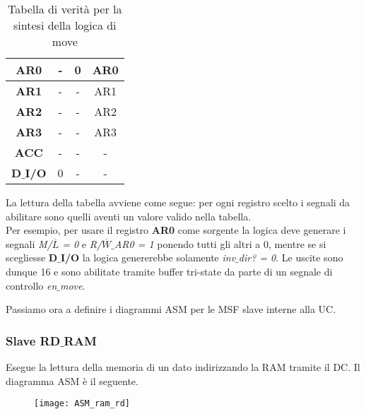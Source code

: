 \begin{table}[H]
\begin{tabular}{|p{25mm}|p{5mm}|p{5mm}|p{25mm}|}
		\hline
		\multicolumn{1}{|c|}{\textbf{AR0}} &
		\multicolumn{1}{c|}{-} &
		\multicolumn{1}{|c|}{0} &
		\multicolumn{1}{c|}{AR0}\\
		
		\hline
		\multicolumn{1}{|c|}{\textbf{AR1}} &
		\multicolumn{1}{c|}{-} &
		\multicolumn{1}{|c|}{-} &
		\multicolumn{1}{c|}{AR1}\\
		
		\hline
		\multicolumn{1}{|c|}{\textbf{AR2}} &
		\multicolumn{1}{c|}{-} &
		\multicolumn{1}{|c|}{-} &
		\multicolumn{1}{c|}{AR2}\\
		
		\hline
		\multicolumn{1}{|c|}{\textbf{AR3}} &
		\multicolumn{1}{c|}{-} &
		\multicolumn{1}{|c|}{-} &
		\multicolumn{1}{c|}{AR3}\\
		
		\hline
		\multicolumn{1}{|c|}{\textbf{ACC}} &
		\multicolumn{1}{c|}{-} &
		\multicolumn{1}{|c|}{-} &
		\multicolumn{1}{c|}{-}\\
		
		\hline
		\multicolumn{1}{|c|}{\textbf{D$\_$I/O}} &
		\multicolumn{1}{c|}{0} &
		\multicolumn{1}{|c|}{-} &
		\multicolumn{1}{c|}{-}\\
		\hline
	\end{tabular}
	\caption{Tabella di verità per la sintesi della logica di move}
\end{table}
\noindent
La lettura della tabella avviene come segue: per ogni registro scelto i segnali da abilitare sono quelli aventi un valore valido nella tabella.\\
Per esempio, per usare il registro \textbf{AR0} come sorgente la logica deve generare i segnali \textit{M/$\overline{L}$ = 0} e \textit{R/$\overline{W}\_$AR0 = 1} ponendo tutti gli altri a 0, mentre se si scegliesse \textbf{D$\_$I/O} la logica genererebbe solamente \textit{inv$\_$dir? = 0}. Le uscite sono dunque 16 e sono abilitate tramite buffer tri-state da parte di un segnale di controllo \textit{en$\_$move}.
\par \bigskip \noindent
Passiamo ora a definire i diagrammi ASM per le MSF slave interne alla UC.
\newpage
\subsubsection{Slave RD$\_$RAM}
Esegue la lettura della memoria di un dato indirizzando la RAM tramite il DC. Il diagramma ASM è il seguente.
\begin{figure}[H]
	\centering
	\texttt{[image: ASM\_ram\_rd]}
	\label{fig:asm_ram_rd}
\end{figure}

